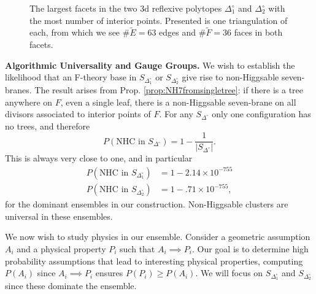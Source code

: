 \documentclass[aps,prl,twocolumn, superscriptaddress,groupedaddress,nofootinbib]{revtex4-1}
\newcommand{\sdoc}{S_{\Delta_1^\circ}}
\newcommand{\sdtc}{S_{\Delta_2^\circ}}
\begin{document}
\begin{figure}[t]
\caption{The largest facets in the two 3d reflexive polytopes $\Delta_1^\circ$ and $\Delta_2^\circ$
with the most number of interior points. Presented is one triangulation of each,
from which we see $\#\tilde E=63$ edges and $\#\tilde F=36$ faces in both facets.}
\label{fig:bigfacetbigone1}
\end{figure}

\vspace{.2cm}
\noindent \textbf{Algorithmic Universality and Gauge Groups.} We wish to establish
the likelihood that an F-theory base in $\sdoc$ or $\sdtc$ give rise to
non-Higgsable seven-branes. The result arises from Prop. \ref{prop:NH7fromsingletree}:
if there is a tree anywhere on $F$, even a single leaf, there is a
non-Higgsable seven-brane on all divisors associated to interior points of $F$.
For any $S_{\Delta^\circ}$ only one configuration has no trees, and therefore
\begin{equation}
P(\text{NHC in } S_{\Delta^\circ}) = 1 - \frac{1}{|S_{\Delta^\circ}|}.
\end{equation}
This is always very close to one, and in particular
\begin{align}
P(\text{NHC in } \sdoc) &= 1-2.14\times 10^{-755} \nonumber \\
P(\text{NHC in } \sdtc) &= 1-.71\times 10^{-755},
\end{align}
for the dominant ensembles in our construction. Non-Higgsable clusters are universal in these ensembles.

We now wish to study physics in
our ensemble. Consider a geometric assumption $A_i$
and a physical property $P_i$ such that $A_i\implies P_i$. Our goal is to determine high
probability assumptions that lead to interesting physical properties, computing $P(A_i)$
since $A_i\implies P_i$ ensures $P(P_i)\geq P(A_i).$ We will focus on $\sdoc$ and $\sdtc$ since
these dominate the ensemble.
\end{document}
